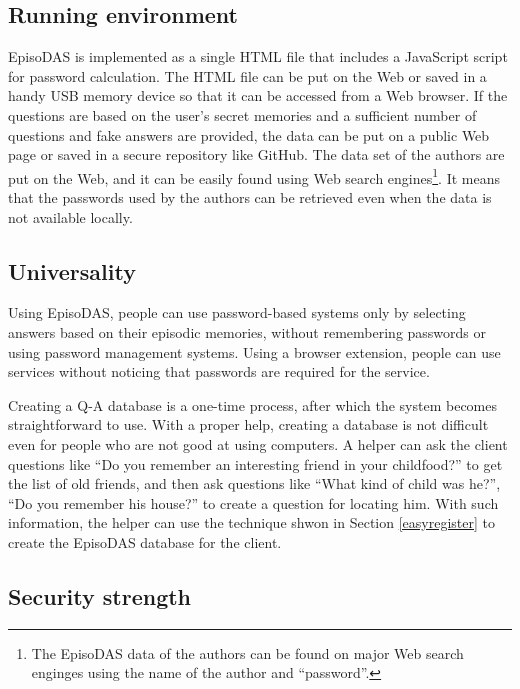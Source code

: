 \documentclass[sigconf]{acmart}
\begin{document}
\subsection{Running environment}

EpisoDAS is implemented as a single HTML file that includes a JavaScript
script for password calculation.
The HTML file can be put on the Web or saved in a handy USB memory device
so that it can be accessed from a Web browser.
%
If the questions are based on the user's secret memories and
a sufficient number of questions and fake answers are provided,
the data can be put on a public Web page or saved in a secure
repository like GitHub.
%
The data set of the authors are put on the Web, and it can be easily
found using Web search engines\footnote{
  The EpisoDAS data of the authors can be found on major Web
  search enginges using the name of the author and ``password''.
}.
It means that the passwords used by the authors can be retrieved
even when the data is not available locally.

\subsection{Universality}

Using EpisoDAS, people can use password-based systems
only by selecting answers based on their episodic memories,
without remembering passwords or using password management systems.
Using a browser extension,
people can use services without noticing that passwords are
required for the service.

Creating a Q-A database is a one-time process,
after which the system becomes straightforward to use.
%
With a proper help, creating a database is not difficult even for
people who are not good at using computers.
A helper can ask the client questions like
``Do you remember an interesting friend in your childfood?''
to get the list of old friends, and then ask questions like
``What kind of child was he?'', ``Do you remember his house?''
to create a question for locating him.
With such information, the helper can use the technique shwon
in Section \ref{easyregister} to create the EpisoDAS database
for the client.

\subsection{Security strength}
\end{document}
